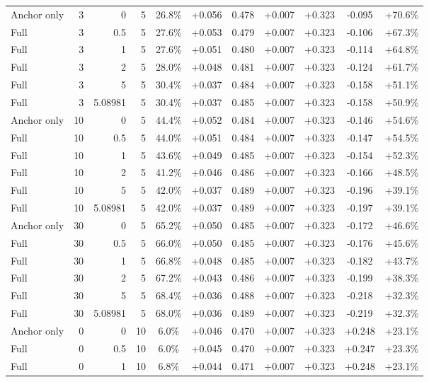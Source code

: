 \begin{table}[htbp]
\begin{tabular}{lrrrccccccc}
Anchor only & 3 & 0 & 5 & 26.8\% & +0.056 & 0.478 & +0.007 & +0.323 & -0.095 & +70.6\% \\
Full & 3 & 0.5 & 5 & 27.6\% & +0.053 & 0.479 & +0.007 & +0.323 & -0.106 & +67.3\% \\
Full & 3 & 1 & 5 & 27.6\% & +0.051 & 0.480 & +0.007 & +0.323 & -0.114 & +64.8\% \\
Full & 3 & 2 & 5 & 28.0\% & +0.048 & 0.481 & +0.007 & +0.323 & -0.124 & +61.7\% \\
Full & 3 & 5 & 5 & 30.4\% & +0.037 & 0.484 & +0.007 & +0.323 & -0.158 & +51.1\% \\
Full & 3 & 5.08981 & 5 & 30.4\% & +0.037 & 0.485 & +0.007 & +0.323 & -0.158 & +50.9\% \\
Anchor only & 10 & 0 & 5 & 44.4\% & +0.052 & 0.484 & +0.007 & +0.323 & -0.146 & +54.6\% \\
Full & 10 & 0.5 & 5 & 44.0\% & +0.051 & 0.484 & +0.007 & +0.323 & -0.147 & +54.5\% \\
Full & 10 & 1 & 5 & 43.6\% & +0.049 & 0.485 & +0.007 & +0.323 & -0.154 & +52.3\% \\
Full & 10 & 2 & 5 & 41.2\% & +0.046 & 0.486 & +0.007 & +0.323 & -0.166 & +48.5\% \\
Full & 10 & 5 & 5 & 42.0\% & +0.037 & 0.489 & +0.007 & +0.323 & -0.196 & +39.1\% \\
Full & 10 & 5.08981 & 5 & 42.0\% & +0.037 & 0.489 & +0.007 & +0.323 & -0.197 & +39.1\% \\
Anchor only & 30 & 0 & 5 & 65.2\% & +0.050 & 0.485 & +0.007 & +0.323 & -0.172 & +46.6\% \\
Full & 30 & 0.5 & 5 & 66.0\% & +0.050 & 0.485 & +0.007 & +0.323 & -0.176 & +45.6\% \\
Full & 30 & 1 & 5 & 66.8\% & +0.048 & 0.485 & +0.007 & +0.323 & -0.182 & +43.7\% \\
Full & 30 & 2 & 5 & 67.2\% & +0.043 & 0.486 & +0.007 & +0.323 & -0.199 & +38.3\% \\
Full & 30 & 5 & 5 & 68.4\% & +0.036 & 0.488 & +0.007 & +0.323 & -0.218 & +32.3\% \\
Full & 30 & 5.08981 & 5 & 68.0\% & +0.036 & 0.489 & +0.007 & +0.323 & -0.219 & +32.3\% \\
Anchor only & 0 & 0 & 10 & 6.0\% & +0.046 & 0.470 & +0.007 & +0.323 & +0.248 & +23.1\% \\
Full & 0 & 0.5 & 10 & 6.0\% & +0.045 & 0.470 & +0.007 & +0.323 & +0.247 & +23.3\% \\
Full & 0 & 1 & 10 & 6.8\% & +0.044 & 0.471 & +0.007 & +0.323 & +0.248 & +23.1\% \\

\end{tabular}
\end{table}
